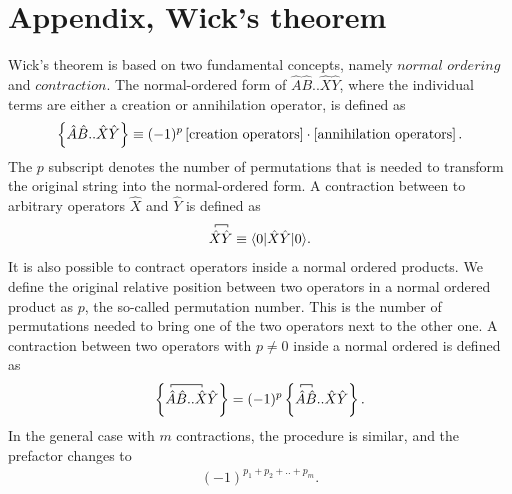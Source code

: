   \section*{Appendix, Wick's theorem}
   Wick's theorem is based on
  two fundamental concepts, namely $\textit{normal ordering}$ and
  $\textit{contraction}$. The normal-ordered form of
  $\hat{A}\hat{B}..\hat{X}\hat{Y}$, where the individual terms are
  either a creation or annihilation operator, is defined as
  \begin{align}
  \label{def: Normal ordering}
  \kpr{\hat{A}\hat{B}..\hat{X}\hat{Y}} \equiv
  (-1)^p\fpr{\text{creation operators}}\cdot\fpr{\text{annihilation
      operators}}.
  \end{align}
  The $p$ subscript denotes the number of permutations that is needed
  to transform the original string into the normal-ordered form. A
  contraction between to arbitrary operators $\hat{X}$ and $\hat{Y}$
  is defined as
  \begin{align}
  \contraction[0.5ex]{}{\hat{X}}{}{\hat{Y}}{} \hat{X}\hat{Y} \equiv
  \for{0}{\hat{X}\hat{Y}}{0}.
  \end{align}
  It is also possible to contract operators inside a normal ordered
  products. We define the original relative position between two
  operators in a normal ordered product as $p$, the so-called
  permutation number. This is the number of permutations needed to
  bring one of the two operators next to the other one. A contraction
  between two operators with $p \neq 0$ inside a normal ordered is
  defined as
  \begin{align}
  \kpr{\contraction[0.5ex]{}{\hat{A}}{\hat{B}..}{\hat{X}}\hat{A}\hat{B}..\hat{X}\hat{Y}}
  = (-1)^p
  \kpr{\contraction[0.5ex]{}{\hat{A}}{}{\hat{B}}\hat{A}\hat{B}..\hat{X}\hat{Y}}.
  \end{align}
  In the general case with $m$ contractions, the procedure is similar,
  and the prefactor changes to
  \begin{align}
  (-1)^{p_1 + p_2 + .. + p_m}.
  \end{align} 

